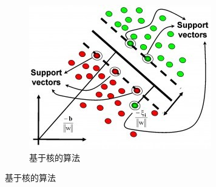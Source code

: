 \begin{figure}[htp]
\begin{subfigure}{.33\textwidth}
	   \includegraphics[width=\linewidth]{ch02/img/ch2/2.1/6.jpg}
	   \caption{基于核的算法}
	   \label{fig:2.sub.6}
	 \end{subfigure}%


\end{figure}
